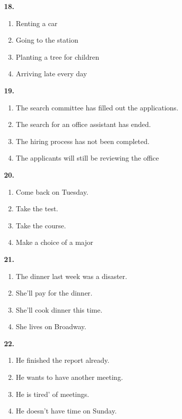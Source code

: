 \documentclass[12pt]{article}
\begin{document}
\noindent\textbf{18.}
\begin{enumerate}[label=(\Alph*),leftmargin=*,itemsep=0.2em]
\item Renting a car
\item Going to the station
\item Planting a tree for children
\item Arriving late every day
\end{enumerate}
\par
\vspace{0.25\baselineskip}
\noindent\textbf{19.}
\begin{enumerate}[label=(\Alph*),leftmargin=*,itemsep=0.2em]
\item The search committee has filled out the applications.
\item The search for an office assistant has ended.
\item The hiring process has not been completed.
\item The applicants will still be reviewing the office
\end{enumerate}
\par
\vspace{0.25\baselineskip}
\noindent\textbf{20.}
\begin{enumerate}[label=(\Alph*),leftmargin=*,itemsep=0.2em]
\item Come back on Tuesday.
\item Take the test.
\item Take the course.
\item Make a choice of a major
\end{enumerate}
\par
\vspace{0.25\baselineskip}
\noindent\textbf{21.}
\begin{enumerate}[label=(\Alph*),leftmargin=*,itemsep=0.2em]
\item The dinner last week was a disaster.
\item She'll pay for the dinner.
\item She'll cook dinner this time.
\item She lives on Broadway.
\end{enumerate}
\par
\vspace{0.25\baselineskip}
\noindent\textbf{22.}
\begin{enumerate}[label=(\Alph*),leftmargin=*,itemsep=0.2em]
\item He finished the report already.
\item He wants to have another meeting.
\item He is tired' of meetings.
\item He doesn't have time on Sunday.
\end{enumerate}
\end{document}

